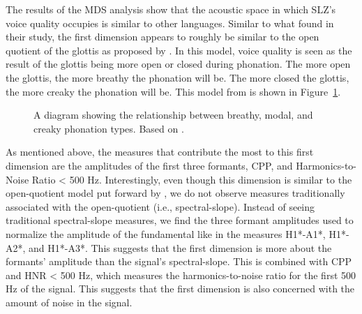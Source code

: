 The results of the MDS analysis show that the acoustic space in which SLZ's voice quality occupies is similar to other languages. Similar to what \citet{keatingCrosslanguageAcousticSpace2023} found in their study, the first dimension appears to roughly be similar to the open quotient of the glottis as proposed by \citet{gordonPhonationTypesCrosslinguistic2001}. In this model, voice quality is seen as the result of the glottis being more open or closed during phonation. The more open the glottis, the more breathy the phonation will be. The more closed the glottis, the more creaky the phonation will be. This model from \citet{gordonPhonationTypesCrosslinguistic2001} is shown in Figure~\ref{fig:phonation_types}.

\begin{figure}[h!]
    \centering
    \caption{A diagram showing the relationship between breathy, modal, and creaky phonation types. Based on \citet{gordonPhonationTypesCrosslinguistic2001}.}
    \label{fig:phonation_types}
\end{figure}

As mentioned above, the measures that contribute the most to this first dimension are the amplitudes of the first three formants, CPP, and Harmonics-to-Noise Ratio < 500 Hz. Interestingly, even though this dimension is similar to the open-quotient model put forward by \citet{gordonPhonationTypesCrosslinguistic2001}, we do not observe measures traditionally associated with the open-quotient (i.e., spectral-slope). Instead of seeing traditional spectral-slope measures, we find the three formant amplitudes used to normalize the amplitude of the fundamental like in the measures H1*-A1*, H1*-A2*, and H1*-A3*. This suggests that the first dimension is more about the formants' amplitude than the signal's spectral-slope. This is combined with CPP and HNR < 500 Hz, which measures the harmonics-to-noise ratio for the first 500 Hz of the signal. This suggests that the first dimension is also concerned with the amount of noise in the signal.

